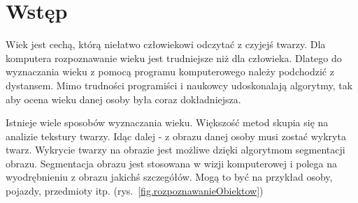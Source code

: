 \documentclass[a4paper,twoside,12pt]{book}
\newcounter{stronyPozaNumeracja}
\begin{document}
    \cleardoublepage


    \pagestyle{tylkoNumeryStron}
    \tableofcontents

    \setcounter{stronyPozaNumeracja}{\value{page}}
    \mainmatter
    \pagestyle{NumeryStronNazwyRozdzialow}


    \chapter{Wstęp}\label{ch:wstęp}

    Wiek jest cechą, którą niełatwo człowiekowi odczytać z czyjejś twarzy.
    Dla komputera rozpoznawanie wieku jest
    trudniejsze niż dla człowieka.
    Dlatego do wyznaczania wieku z pomocą programu komputerowego należy podchodzić z dystansem.
    Mimo trudności programiści
    i naukowcy udoskonalają algorytmy,
    tak aby ocena wieku danej osoby była coraz dokładniejsza.

    Istnieje wiele sposobów wyznaczania wieku.
    Większość metod skupia się na analizie tekstury twarzy.
    Idąc dalej - z obrazu danej osoby musi zostać wykryta twarz.
    Wykrycie twarzy na obrazie jest możliwe dzięki algorytmom segmentacji obrazu.
    Segmentacja obrazu jest stosowana w wizji komputerowej i polega na wyodrębnieniu z obrazu jakichś szczegółów.
    Mogą to być na przykład osoby, pojazdy, przedmioty itp. (rys.~\ref{fig.rozpoznawanieObiektow})
\end{document}
